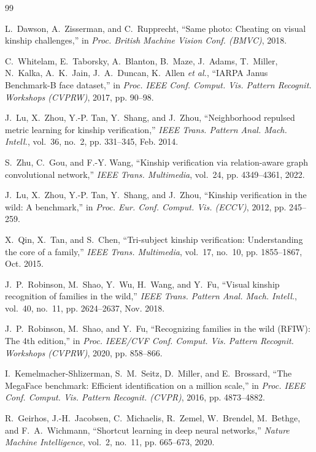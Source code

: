 \documentclass[preprint,12pt]{elsarticle}
\begin{document}
\begin{thebibliography}{99}

L.~Dawson, A.~Zisserman, and C.~Rupprecht, ``Same photo: Cheating on visual kinship challenges,'' in \emph{Proc. British Machine Vision Conf. (BMVC)}, 2018.

C.~Whitelam, E.~Taborsky, A.~Blanton, B.~Maze, J.~Adams, T.~Miller, N.~Kalka, A.~K.~Jain, J.~A.~Duncan, K.~Allen \emph{et al.}, ``IARPA Janus Benchmark-B face dataset,'' in \emph{Proc. IEEE Conf. Comput. Vis. Pattern Recognit. Workshops (CVPRW)}, 2017, pp. 90--98.

J.~Lu, X.~Zhou, Y.-P. Tan, Y.~Shang, and J.~Zhou, ``Neighborhood repulsed metric learning for kinship verification,'' \emph{IEEE Trans. Pattern Anal. Mach. Intell.}, vol.~36, no.~2, pp. 331--345, Feb. 2014.

S.~Zhu, C.~Gou, and F.-Y. Wang, ``Kinship verification via relation-aware graph convolutional network,'' \emph{IEEE Trans. Multimedia}, vol.~24, pp. 4349--4361, 2022.

J.~Lu, X.~Zhou, Y.-P. Tan, Y.~Shang, and J.~Zhou, ``Kinship verification in the wild: A benchmark,'' in \emph{Proc. Eur. Conf. Comput. Vis. (ECCV)}, 2012, pp. 245--259.

X.~Qin, X.~Tan, and S.~Chen, ``Tri-subject kinship verification: Understanding the core of a family,'' \emph{IEEE Trans. Multimedia}, vol.~17, no.~10, pp. 1855--1867, Oct. 2015.

J.~P.~Robinson, M.~Shao, Y.~Wu, H.~Wang, and Y.~Fu, ``Visual kinship recognition of families in the wild,'' \emph{IEEE Trans. Pattern Anal. Mach. Intell.}, vol.~40, no.~11, pp. 2624--2637, Nov. 2018.

J.~P.~Robinson, M.~Shao, and Y.~Fu, ``Recognizing families in the wild (RFIW): The 4th edition,'' in \emph{Proc. IEEE/CVF Conf. Comput. Vis. Pattern Recognit. Workshops (CVPRW)}, 2020, pp. 858--866.

I.~Kemelmacher-Shlizerman, S.~M.~Seitz, D.~Miller, and E.~Brossard, ``The MegaFace benchmark: Efficient identification on a million scale,'' in \emph{Proc. IEEE Conf. Comput. Vis. Pattern Recognit. (CVPR)}, 2016, pp. 4873--4882.

R.~Geirhos, J.-H.~Jacobsen, C.~Michaelis, R.~Zemel, W.~Brendel, M.~Bethge, and F.~A.~Wichmann, ``Shortcut learning in deep neural networks,'' \emph{Nature Machine Intelligence}, vol.~2, no.~11, pp. 665--673, 2020.


\end{thebibliography}
\end{document}
